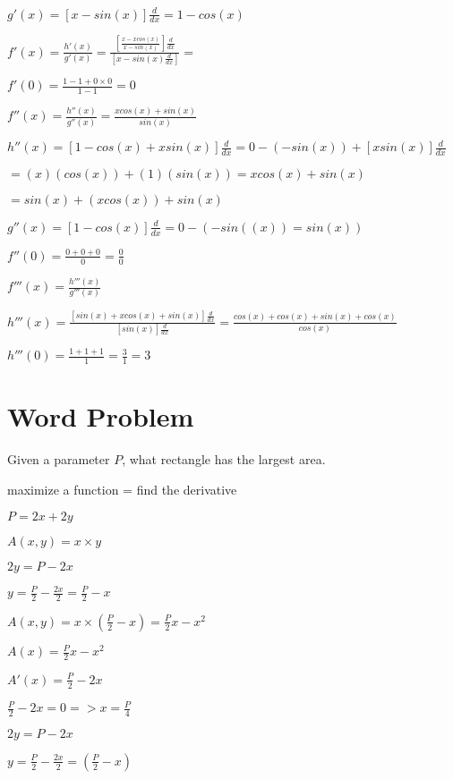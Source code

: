 \documentclass[12pt,a4paper]{article}
\begin{document}
\noindent $g'(x) = [x-sin(x)]\frac{d}{dx} = 1 - cos(x)$

\noindent $f'(x) = \frac{h'(x)}{g'(x)} = \frac{[\frac{x-xcos(x)}{x-sin(x)}]\frac{d}{dx}}{[x-sin(x)\frac{d}{dx}]} = $

\noindent $f'(0) = \frac{1-1 + 0 \times 0}{1 -1} = 0$

\noindent $f''(x) = \frac{h''(x)}{g''(x)} = \frac{xcos(x) + sin(x)}{sin(x)}$

\noindent $h''(x) = [1-cos(x)+xsin(x)]\frac{d}{dx} = 0 - (-sin(x)) + [xsin(x)]\frac{d}{dx}$

$= (x)(cos(x)) + (1)(sin(x)) = xcos(x) + sin(x)$

$= sin(x) +(xcos(x)) + sin(x)$

$g''(x) = [1-cos(x)]\frac{d}{dx} = 0 - (-sin((x)) = sin(x))$ 


\noindent $f''(0) = \frac{0 + 0 + 0}{0} = \frac{0}{0}$

\noindent $f'''(x) = \frac{h'''(x)}{g'''(x)}$

\noindent $h'''(x) = \frac{[sin(x) + xcos(x) +sin(x)]\frac{d}{dx}}{[sin(x)]\frac{d}{dx}} = \frac{cos(x) + cos(x) + sin(x) + cos(x)}{cos(x)}$

\noindent $h'''(0) = \frac{1 + 1 + 1}{1} = \frac{3}{1} = 3$

\newpage

\section*{Word Problem}


Given a parameter $P$, what rectangle has the largest area.

maximize a function = find the derivative

\noindent $P = 2x + 2y$

\noindent $A(x, y) = x \times y$

\noindent $2y = P -2x$

\noindent $y = \frac{P}{2} - \frac{2x}{2} = \frac{P}{2} - x$

\noindent $A(x, y) = x \times (\frac{P}{2} - x) = \frac{P}{2}x - x^2$

\noindent $A(x) = \frac{P}{2}x - x^2$

\noindent $A'(x) = \frac{P}{2} - 2x$

\noindent $\frac{P}{2} - 2x = 0 => x = \frac{P}{4}$

\noindent $2y = P - 2x$

\noindent $y = \frac{P}{2} - \frac{2x}{2} = (\frac{P}{2} - x)$
\end{document}
